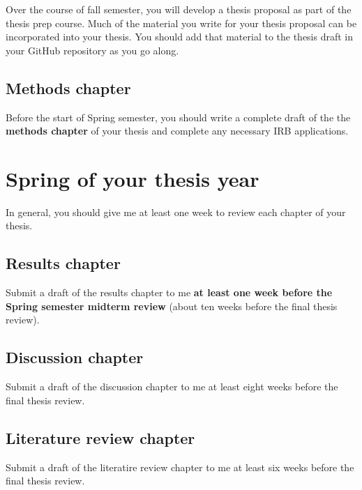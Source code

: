 \documentclass[
]{book}
\begin{document}
Over the course of fall semester, you will develop a thesis proposal as part of the thesis prep course. Much of the material you write for your thesis proposal can be incorporated into your thesis. You should add that material to the thesis draft in your GitHub repository as you go along.

\hypertarget{methods-chapter}{%
\subsection{Methods chapter}\label{methods-chapter}}

Before the start of Spring semester, you should write a complete draft of the the \textbf{methods chapter} of your thesis and complete any necessary IRB applications.

\hypertarget{spring-of-your-thesis-year}{%
\section{Spring of your thesis year}\label{spring-of-your-thesis-year}}

In general, you should give me at least one week to review each chapter of your thesis.

\hypertarget{results-chapter}{%
\subsection{Results chapter}\label{results-chapter}}

Submit a draft of the results chapter to me \textbf{at least one week before the Spring semester midterm review} (about ten weeks before the final thesis review).

\hypertarget{discussion-chapter}{%
\subsection{Discussion chapter}\label{discussion-chapter}}

Submit a draft of the discussion chapter to me at least eight weeks before the final thesis review.

\hypertarget{literature-review-chapter}{%
\subsection{Literature review chapter}\label{literature-review-chapter}}

Submit a draft of the literatire review chapter to me at least six weeks before the final thesis review.
\end{document}
